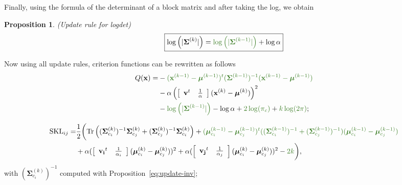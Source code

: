 \documentclass[a4paper,11pt,DIV=16,abstracton]{scrartcl}
\newtheorem{prop}{Proposition}
\begin{document}
        Finally, using the formula of the determinant of a block matrix and after taking the log, we obtain
        \begin{prop}
        \label{eq:update-log}
            (Update rule for logdet)
            \begin{equation*}
                \fbox{$\log \left(|\boldsymbol{\Sigma}^{(k)}|\right) = \textcolor{OliveGreen}{\log \left(|\boldsymbol{\Sigma}^{(k-1)}|\right)} + \log \alpha$}
            \end{equation*}
        \end{prop}

        Now using all update rules, criterion functions can be rewritten as follows
        \begin{align}
        \label{eq:q-update}
            Q(\mathbf{x}) = &- \textcolor{OliveGreen}{(\mathbf{x}^{(k-1)} - \boldsymbol{\mu}^{(k-1)})^t (\boldsymbol{\Sigma}^{(k-1)})^{-1} (\mathbf{x}^{(k-1)} - \boldsymbol{\mu}^{(k-1)})} \nonumber \\
            &- \alpha \left( \left[\begin{array}{cc} \mathbf{v}^t & \frac{1}{\alpha} \end{array}\right] (\mathbf{x}^{(k)} - \boldsymbol{\mu}^{(k)}) \right)^2 \nonumber \\
            &- \textcolor{OliveGreen}{\log \left(|\boldsymbol{\Sigma}^{(k-1)}|\right)} - \log \alpha  + \textcolor{OliveGreen}{2 \log (\pi_c)} + \textcolor{OliveGreen}{k \log(2 \pi)};
        \end{align}

        \begin{align}
        \label{eq:skl-update}
            \text{SKL}_{ij} = &\frac{1}{2} \biggl( \text{Tr} \left((\boldsymbol{\Sigma}_{c_i}^{(k)})^{-1} \boldsymbol{\Sigma}_{c_j}^{(k)} + (\boldsymbol{\Sigma}_{c_j}^{(k)})^{-1} \boldsymbol{\Sigma}_{c_i}^{(k)}\right)
            + \textcolor{OliveGreen}{(\boldsymbol{\mu}_{c_i}^{(k-1)} - \boldsymbol{\mu}_{c_j}^{(k-1)})^t ((\boldsymbol{\Sigma}_{c_i}^{(k-1)})^{-1} + (\boldsymbol{\Sigma}_{c_j}^{(k-1)})^{-1}) (\boldsymbol{\mu}_{c_i}^{(k-1)} - \boldsymbol{\mu}_{c_j}^{(k-1)})} \nonumber \\
            &+ \alpha ( \left[\begin{array}{cc} \mathbf{v_i}^t & \frac{1}{\alpha_i} \end{array}\right] (\boldsymbol{\mu}_{c_i}^{(k)} - \boldsymbol{\mu}_{c_j}^{(k)}) )^2
            + \alpha ( \left[\begin{array}{cc} \mathbf{v_j}^t & \frac{1}{\alpha_j} \end{array}\right] (\boldsymbol{\mu}_{c_i}^{(k)} - \boldsymbol{\mu}_{c_j}^{(k)}) )^2
            - \textcolor{OliveGreen}{2k} \biggr),
        \end{align}
        with $(\boldsymbol{\Sigma}_{c_i}^{(k)})^{-1}$ computed with Proposition~\ref{eq:update-inv};
\end{document}
